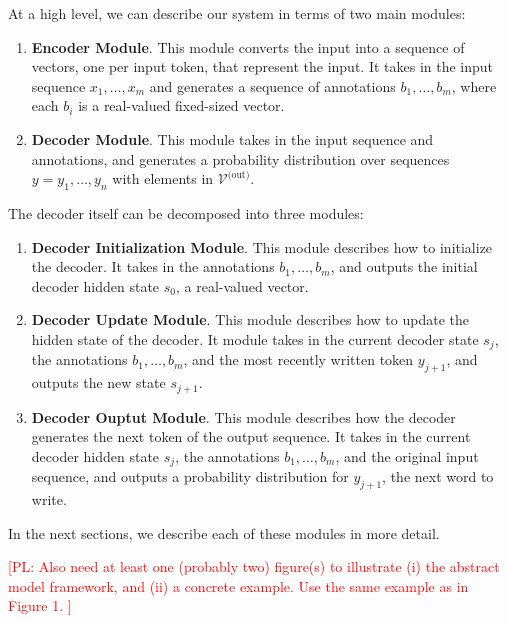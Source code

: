 \documentclass[11pt,letterpaper]{article}
\newcommand{\vocabout}{\mathcal{V}^{\text{(out)}}}
\newcommand\pl[1]{\textcolor{red}{[PL: #1]}}
\begin{document}
At a high level, we can describe our system in terms of two main modules:
\begin{enumerate}
  \item \textbf{Encoder Module}.  This module 
    converts the input into a sequence of vectors,
    one per input token, that represent the input.
    It takes in the input sequence
    $x_1, \dotsc, x_m$ and generates a sequence of 
    annotations $b_1, \dotsc, b_m$,
    where each $b_i$ is a real-valued fixed-sized vector.
  \item \textbf{Decoder Module}.  This module
    takes in the input sequence and annotations,
    and generates a probability distribution
    over sequences $y = y_1, \dotsc, y_n$
    with elements in $\vocabout$.
\end{enumerate}
The decoder itself can be decomposed into three modules:
\begin{enumerate}
  \item \textbf{Decoder Initialization Module}.
    This module describes how to initialize the decoder.
    It takes in the annotations $b_1, \dotsc, b_m$, and
    outputs the initial decoder hidden state $s_0$,
    a real-valued vector.
  \item \textbf{Decoder Update Module}.  This module describes
    how to update the hidden state of the decoder.
    It module takes in the current decoder state $s_{j}$,
    the annotations $b_1, \dotsc, b_m$, and the most recently
    written token $y_{j+1}$, and outputs the new state $s_{j+1}$.
  \item \textbf{Decoder Ouptut Module}.  This module
    describes how the decoder generates the next token of the 
    output sequence.
    It takes in the current decoder hidden state $s_{j}$,
    the annotations $b_1, \dotsc, b_m$,
    and the original input sequence,
    and outputs a probability distribution 
    for $y_{j+1}$, the next word to write.
\end{enumerate}
In the next sections, we describe each of these modules in more detail.



\pl{
  Also need at least one (probably two) figure(s)
  to illustrate (i) the abstract model framework,
  and (ii) a concrete example.  Use the same example as in Figure 1.
}
\end{document}
